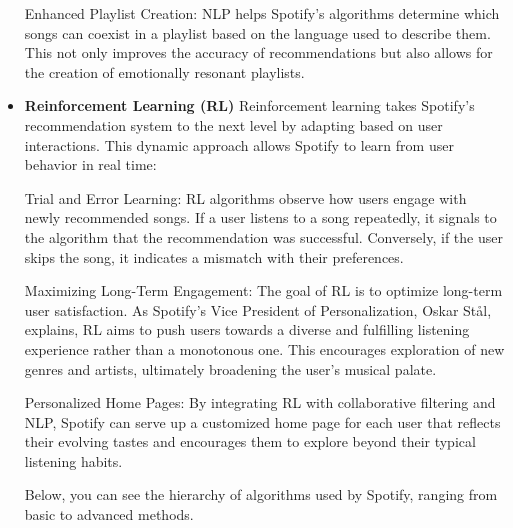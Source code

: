 \documentclass[12pt,a4paper]{article}
\begin{document}
\begin{itemize}
Enhanced Playlist Creation: NLP helps Spotify’s algorithms determine which songs can coexist in a playlist based on the language used to describe them. This not only improves the accuracy of recommendations but also allows for the creation of emotionally resonant playlists.

 \item \textbf{Reinforcement Learning (RL)}
Reinforcement learning takes Spotify’s recommendation system to the next level by adapting based on user interactions. This dynamic approach allows Spotify to learn from user behavior in real time:

Trial and Error Learning: RL algorithms observe how users engage with newly recommended songs. If a user listens to a song repeatedly, it signals to the algorithm that the recommendation was successful. Conversely, if the user skips the song, it indicates a mismatch with their preferences.

Maximizing Long-Term Engagement: The goal of RL is to optimize long-term user satisfaction. As Spotify's Vice President of Personalization, Oskar Stål, explains, RL aims to push users towards a diverse and fulfilling listening experience rather than a monotonous one. This encourages exploration of new genres and artists, ultimately broadening the user's musical palate.

Personalized Home Pages: By integrating RL with collaborative filtering and NLP, Spotify can serve up a customized home page for each user that reflects their evolving tastes and encourages them to explore beyond their typical listening habits.

Below, you can see the hierarchy of algorithms used by Spotify, ranging from basic to advanced methods.

\end{itemize}


\begin{center}
\end{center}
\end{document}
